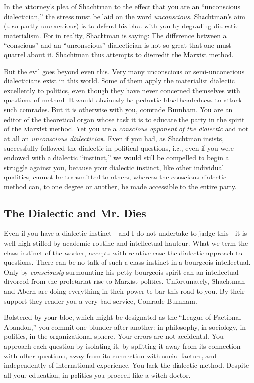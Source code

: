 In the attorney’s plea of Shachtman to the effect that you are an “unconscious dialectician,” the stress must be laid on the word \emph{unconscious}. Shachtman’s aim (also partly unconscious) is to defend his bloc with you by degrading dialectic materialism. For in reality, Shachtman is saying: The difference between a “conscious” and an “unconscious” dialectician is not so great that one must quarrel about it. Shachtman thus attempts to discredit the Marxist method.

But the evil goes beyond even this. Very many unconscious or semi-unconscious dialecticians exist in this world. Some of them apply the materialist dialectic excellently to politics, even though they have never concerned themselves with questions of method. It would obviously be pedantic blockheadedness to attack such comrades. But it is otherwise with you, comrade Burnham. You are an editor of the theoretical organ whose task it is to educate the party in the spirit of the Marxist method. Yet you are a \emph{conscious opponent of the dialectic} and not at all an \emph{unconscious dialectician}. Even if you had, as Shachtman insists, successfully followed the dialectic in political questions, i.e., even if you were endowed with a dialectic “instinct,” we would still be compelled to begin a struggle against you, because your dialectic instinct, like other individual qualities, cannot be transmitted to others, whereas the conscious dialectic method can, to one degree or another, be made accessible to the entire party.

\subsection*{The Dialectic and Mr. Dies}

Even if you have a dialectic instinct---and I do not undertake to judge this---it is well-nigh stifled by academic routine and intellectual hauteur. What we term the class instinct of the worker, accepts with relative ease the dialectic approach to questions. There can be no talk of such a class instinct in a bourgeois intellectual. Only by \emph{consciously} surmounting his petty-bourgeois spirit can an intellectual divorced from the proletariat rise to Marxist politics. Unfortunately, Shachtman and Abern are doing everything in their power to bar this road to you. By their support they render you a very bad service, Comrade Burnham.

Bolstered by your bloc, which might be designated as the “League of Factional Abandon,” you commit one blunder after another: in philosophy, in sociology, in politics, in the organizational sphere. Your errors are not accidental. You approach each question by isolating it, by splitting it away from its connection with other questions, away from its connection with social factors, and---independently of international experience. You lack the dialectic method. Despite all your education, in politics you proceed like a witch-doctor.

